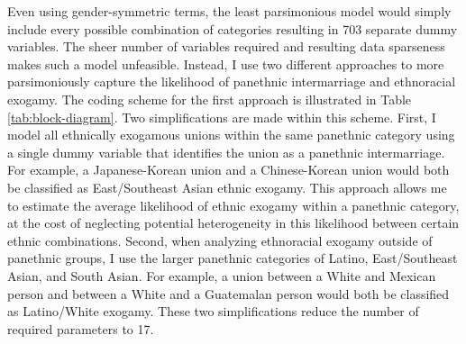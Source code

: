 \documentclass[11pt,]{article}
\begin{document}
Even using gender-symmetric terms, the least parsimonious model would simply include every possible combination of categories resulting in 703 separate dummy variables. The sheer number of variables required and resulting data sparseness makes such a model unfeasible. Instead, I use two different approaches to more parsimoniously capture the likelihood of panethnic intermarriage and ethnoracial exogamy. The coding scheme for the first approach is illustrated in Table \ref{tab:block-diagram}. Two simplifications are made within this scheme. First, I model all ethnically exogamous unions within the same panethnic category using a single dummy variable that identifies the union as a panethnic intermarriage. For example, a Japanese-Korean union and a Chinese-Korean union would both be classified as East/Southeast Asian ethnic exogamy. This approach allows me to estimate the average likelihood of ethnic exogamy within a panethnic category, at the cost of neglecting potential heterogeneity in this likelihood between certain ethnic combinations. Second, when analyzing ethnoracial exogamy outside of panethnic groups, I use the larger panethnic categories of Latino, East/Southeast Asian, and South Asian. For example, a union between a White and Mexican person and between a White and a Guatemalan person would both be classified as Latino/White exogamy. These two simplifications reduce the number of required parameters to 17.
\end{document}
